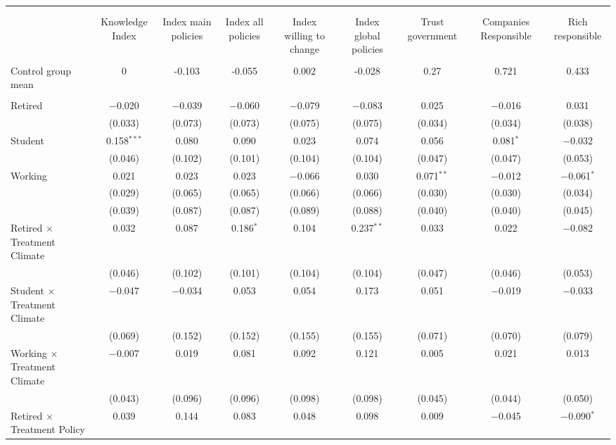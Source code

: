 
\begin{tabular}{@{\extracolsep{5pt}}lcccccccc} 
\\[-1.8ex]\hline 
\hline \\[-1.8ex] 
\\[-1.8ex] & Knowledge Index & Index main policies & Index all policies & Index willing to change & Index global policies & Trust government & Companies Responsible & Rich responsible \\ 
\hline \\[-1.8ex] 
 Control group mean & 0 & -0.103 & -0.055 & 0.002 & -0.028 & 0.27 & 0.721 & 0.433  \\ \hline \\[-1.8ex] Retired & $-$0.020 & $-$0.039 & $-$0.060 & $-$0.079 & $-$0.083 & 0.025 & $-$0.016 & 0.031 \\ 
  & (0.033) & (0.073) & (0.073) & (0.075) & (0.075) & (0.034) & (0.034) & (0.038) \\ 
 Student & 0.158$^{***}$ & 0.080 & 0.090 & 0.023 & 0.074 & 0.056 & 0.081$^{*}$ & $-$0.032 \\ 
  & (0.046) & (0.102) & (0.101) & (0.104) & (0.104) & (0.047) & (0.047) & (0.053) \\ 
 Working & 0.021 & 0.023 & 0.023 & $-$0.066 & 0.030 & 0.071$^{**}$ & $-$0.012 & $-$0.061$^{*}$ \\ 
  & (0.029) & (0.065) & (0.065) & (0.066) & (0.066) & (0.030) & (0.030) & (0.034) \\ 
  & (0.039) & (0.087) & (0.087) & (0.089) & (0.088) & (0.040) & (0.040) & (0.045) \\ 
 Retired $\times$ Treatment Climate & 0.032 & 0.087 & 0.186$^{*}$ & 0.104 & 0.237$^{**}$ & 0.033 & 0.022 & $-$0.082 \\ 
  & (0.046) & (0.102) & (0.101) & (0.104) & (0.104) & (0.047) & (0.046) & (0.053) \\ 
 Student $\times$ Treatment Climate & $-$0.047 & $-$0.034 & 0.053 & 0.054 & 0.173 & 0.051 & $-$0.019 & $-$0.033 \\ 
  & (0.069) & (0.152) & (0.152) & (0.155) & (0.155) & (0.071) & (0.070) & (0.079) \\ 
 Working $\times$ Treatment Climate & $-$0.007 & 0.019 & 0.081 & 0.092 & 0.121 & 0.005 & 0.021 & 0.013 \\ 
  & (0.043) & (0.096) & (0.096) & (0.098) & (0.098) & (0.045) & (0.044) & (0.050) \\ 
 Retired $\times$ Treatment Policy & 0.039 & 0.144 & 0.083 & 0.048 & 0.098 & 0.009 & $-$0.045 & $-$0.090$^{*}$ \\ 

\end{tabular}
